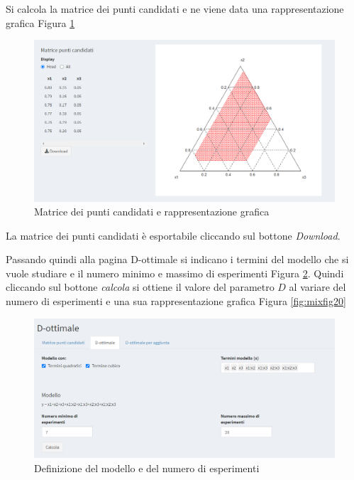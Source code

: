 \documentclass[
  11pt,
]{book}
\begin{document}
Si calcola la matrice dei punti candidati e ne viene data una rappresentazione grafica Figura \ref{fig:mixfig18}

\begin{figure}[ht]

{\centering \includegraphics[width=1\linewidth]{Immagini/Mixt/18_cp} 

}

\caption{Matrice dei punti candidati e rappresentazione grafica}\label{fig:mixfig18}
\end{figure}

La matrice dei punti candidati è esportabile cliccando sul bottone \emph{Download}.

Passando quindi alla pagina D-ottimale si indicano i termini del modello che si vuole studiare e il numero minimo e massimo di esperimenti Figura \ref{fig:mixfig19}. Quindi cliccando sul bottone \emph{calcola} si ottiene il valore del parametro \(D\) al variare del numero di esperimenti e una sua rappresentazione grafica Figura \ref{fig:mixfig20}

\begin{figure}[ht]

{\centering \includegraphics[width=1\linewidth]{Immagini/Mixt/19_dopt} 

}

\caption{Definizione del modello e del numero di esperimenti}\label{fig:mixfig19}
\end{figure}
\end{document}
